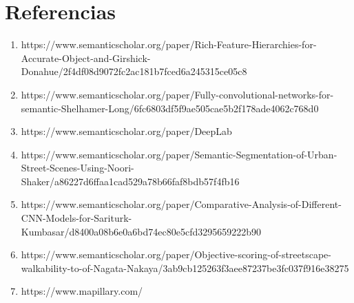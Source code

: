 \documentclass{article}
\begin{document}
\section*{Referencias}
\begin{enumerate}
    \item https://www.semanticscholar.org/paper/Rich-Feature-Hierarchies-for-Accurate-Object-and-Girshick-Donahue/2f4df08d9072fc2ac181b7fced6a245315ce05c8
    \item https://www.semanticscholar.org/paper/Fully-convolutional-networks-for-semantic-Shelhamer-Long/6fc6803df5f9ae505cae5b2f178ade4062c768d0
    \item https://www.semanticscholar.org/paper/DeepLab%
    \item https://www.semanticscholar.org/paper/Semantic-Segmentation-of-Urban-Street-Scenes-Using-Noori-Shaker/a86227d6ffaa1cad529a78b66faf8bdb57f4fb16\
    \item https://www.semanticscholar.org/paper/Comparative-Analysis-of-Different-CNN-Models-for-Sariturk-Kumbasar/d8400a08b6e0a6bd74ec80e5cfd3295659222b90
    \item https://www.semanticscholar.org/paper/Objective-scoring-of-streetscape-walkability-to-of-Nagata-Nakaya/3ab9cb125263f3aee87237be3fc037f916e38275
    \item https://www.mapillary.com/
\end{enumerate}
\end{document}
